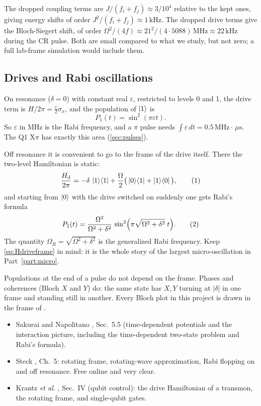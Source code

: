 \documentclass[11pt,a4paper]{article}
\DeclareRobustCommand{\code}[1]{\texttt{\detokenize{#1}}}
\newcommand{\MHz}{\,\mathrm{MHz}}
\newcommand{\kHz}{\,\mathrm{kHz}}
\newcommand{\us}{\,\mu\mathrm{s}}
\newcommand{\eqlab}[1]{\refstepcounter{equation}\tag{\theequation}\label{#1}}
\begin{document}
The dropped coupling terms are \(J/(f_i+f_j)\approx 3/10^4\) relative to the kept ones, giving energy shifts of order
\(J^2/(f_i+f_j)\approx 1\kHz\). The dropped drive terms give the Bloch-Siegert shift, of order
\(\Omega^2/(4f)\approx 21^2/(4\cdot 5088)\MHz\approx 22\kHz\) during the CR pulse. Both are small compared to what we
study, but not zero; a full lab-frame simulation would include them.

\subsection{Drives and Rabi oscillations}\label{sec:rabi}

On resonance (\(\delta = 0\)) with constant real \(\varepsilon\), restricted to levels 0 and 1, the drive term is
\(H/2\pi = \tfrac{\varepsilon}{2}\sigma_x\), and the population of \(\ket{1}\) is
\[
P_1(t) = \sin^2(\pi\varepsilon t).
\]
So \(\varepsilon\) in MHz is the Rabi frequency, and a \(\pi\) pulse needs \(\int\varepsilon\,dt = 0.5\MHz\cdot\us\). The Q1
X\(\pi\) has exactly this area (\cref{sec:pulses}).

Off resonance it is convenient to go to the frame of the drive itself. There the two-level Hamiltonian is static:
\[
\frac{H_{\text{d}}}{2\pi} = -\delta\,\ket{1}\!\bra{1} + \frac{\Omega}{2}\big(\ket{0}\!\bra{1} + \ket{1}\!\bra{0}\big),
\eqlab{eq:Hdriveframe}
\]
and starting from \(\ket{0}\) with the drive switched on suddenly one gets Rabi's formula
\[
P_1(t) = \frac{\Omega^2}{\Omega^2+\delta^2}\,\sin^2\!\Big(\pi\sqrt{\Omega^2+\delta^2}\;t\Big).
\eqlab{eq:rabi}
\]
The quantity \(\Omega_R = \sqrt{\Omega^2+\delta^2}\) is the generalized Rabi frequency. Keep \cref{eq:Hdriveframe} in mind:
it is the whole story of the largest micro-oscillation in Part~\ref{part:micro}.

\begin{keybox}
Populations at the end of a pulse do not depend on the frame. Phases and coherences (Bloch \(X\) and \(Y\)) do: the same
state has \(X, Y\) turning at \(|\delta|\) in one frame and standing still in another. Every Bloch plot in this project is
drawn in the frame of \code{frame_MHz}.
\end{keybox}

\begin{readbox}
\begin{itemize}
\item Sakurai and Napolitano \cite{sakurai}, Sec.~5.5 (time-dependent potentials and the interaction picture,
  including the time-dependent two-state problem and Rabi's formula).
\item Steck \cite{steck}, Ch.~5: rotating frame, rotating-wave approximation, Rabi flopping on and off resonance.
  Free online and very clear.
\item Krantz \emph{et al.} \cite{krantz2019}, Sec.~IV (qubit control): the drive Hamiltonian of a transmon, the
  rotating frame, and single-qubit gates.
\end{itemize}
\end{readbox}
\end{document}

